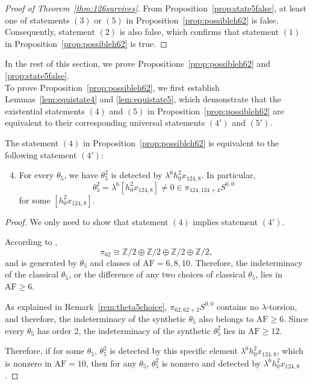 \documentclass{amsart}
\numberwithin{equation}{section}
\newcommand{\AF}{\mathrm{AF}}
\begin{document}
\begin{proof}[Proof of Theorem~\ref{thm:126survives}]
    From Proposition~\ref{prop:state5false}, at least one of  statements $(3)$ or $(5)$ in Proposition~\ref{prop:possibleh62} is false. Consequently,  statement $(2)$ is also false, which confirms that statement $(1)$ in Proposition~\ref{prop:possibleh62} is true.  
\end{proof}

In the rest of this section, we prove Propositions~\ref{prop:possibleh62} and \ref{prop:state5false}.\\

To prove Proposition~\ref{prop:possibleh62}, we first establish Lemmas~\ref{lem:equistate4} and \ref{lem:equistate5}, which demonstrate that the existential statements $(4)$ and $(5)$ in Proposition~\ref{prop:possibleh62} are equivalent to their corresponding universal statements $(4')$ and $(5')$. 

\begin{lemma} \label{lem:equistate4}
    The statement $(4)$ in Proposition~\ref{prop:possibleh62} is equivalent to the following statement $(4')$:
    \begin{enumerate}[label=(\arabic*')]\setcounter{enumi}{3} 
    \item For every $\theta_5$, we have $\theta_5^2$ is detected by $\lambda^6 h_0^2x_{124,8}$. In particular, 
    $$\theta_5^2 = \lambda^6 [h_0^2x_{124,8}] \neq 0 \in \pi_{124,124+4}S^{0,0}$$
    for some $[h_0^2x_{124,8}]$.
    \end{enumerate}
\end{lemma}

\begin{proof}
    We only need to show that statement $(4)$ implies statement $(4')$. 
    
    According to \cite{IWX}, 
    $$\pi_{62} \cong \mathbb{Z}/2 \oplus \mathbb{Z}/2 \oplus \mathbb{Z}/2 \oplus \mathbb{Z}/2,$$ 
    and is generated by $\theta_5$ and classes of $\AF=6,8,10$. Therefore, the indeterminacy of the classical $\theta_5$, or the difference of any two choices of classical $\theta_5$, lies in $\AF \ge 6$.
    
    As explained in Remark~\ref{rem:theta5choice}, $\pi_{62,62+2}S^{0,0}$ contains no $\lambda$-torsion, and therefore, the indeterminacy of the synthetic $\theta_5$ also belongs to $\AF \ge 6$. Since every $\theta_5$ has order 2, the indeterminacy of the synthetic $\theta_5^2$ lies in $\AF \ge 12$.

    Therefore, if for some $\theta_5$, $\theta_5^2$ is detected by this specific element $\lambda^6 h_0^2x_{124,8}$, which is nonzero in $\AF=10$, then for any $\theta_5$, $\theta_5^2$ is nonzero and detected by $\lambda^6 h_0^2x_{124,8}$.

\end{proof}
\end{document}
